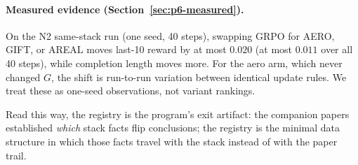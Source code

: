 \paragraph{Measured evidence (Section~\ref{sec:p6-measured}).} On the N2
same-stack run (one seed, 40 steps), swapping GRPO for AERO, GIFT, or AREAL
moves last-10 reward by at most $0.020$ (at most $0.011$ over all 40 steps),
while completion length moves more. For the aero arm, which never changed
$G$, the shift is run-to-run variation between identical update rules. We
treat these as one-seed observations, not variant rankings.

Read this way, the registry is the program's exit artifact: the companion papers
established \emph{which} stack facts flip conclusions; the registry is the
minimal data structure in which those facts travel with the stack instead of
with the paper trail.
